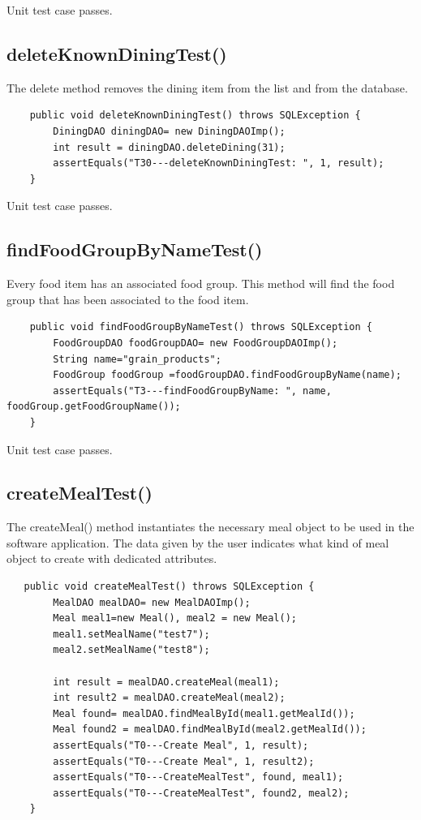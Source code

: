 \documentclass[table]{scrreprt}
\begin{document}
Unit test case passes.


\subsection{deleteKnownDiningTest()}
The delete method removes the dining item from the list and from the database.

\begin{verbatim}
    public void deleteKnownDiningTest() throws SQLException {
        DiningDAO diningDAO= new DiningDAOImp();
        int result = diningDAO.deleteDining(31);
        assertEquals("T30---deleteKnownDiningTest: ", 1, result);
    }
\end{verbatim}

Unit test case passes.

\subsection{findFoodGroupByNameTest()}
Every food item has an associated food group. This method will find the food group that has been associated to the food item.

\begin{verbatim}
    public void findFoodGroupByNameTest() throws SQLException {
        FoodGroupDAO foodGroupDAO= new FoodGroupDAOImp();
        String name="grain_products";
        FoodGroup foodGroup =foodGroupDAO.findFoodGroupByName(name);
        assertEquals("T3---findFoodGroupByName: ", name, foodGroup.getFoodGroupName());
    }
\end{verbatim}

Unit test case passes.

\subsection{createMealTest()}

The createMeal() method instantiates the necessary meal object to be used in the software application. The data given by the user indicates what kind of meal object to create with dedicated attributes.

\begin{verbatim}
   public void createMealTest() throws SQLException {
        MealDAO mealDAO= new MealDAOImp();
        Meal meal1=new Meal(), meal2 = new Meal();
        meal1.setMealName("test7");
        meal2.setMealName("test8");

        int result = mealDAO.createMeal(meal1);
        int result2 = mealDAO.createMeal(meal2);
        Meal found= mealDAO.findMealById(meal1.getMealId());
        Meal found2 = mealDAO.findMealById(meal2.getMealId());
        assertEquals("T0---Create Meal", 1, result);
        assertEquals("T0---Create Meal", 1, result2);
        assertEquals("T0---CreateMealTest", found, meal1);
        assertEquals("T0---CreateMealTest", found2, meal2);
    }
\end{verbatim}
\end{document}
